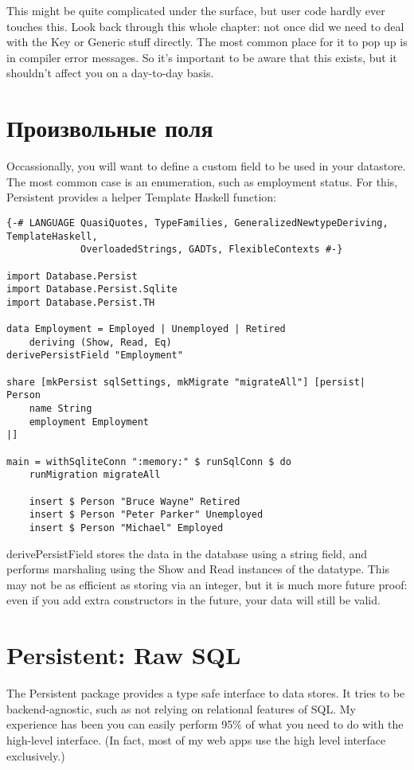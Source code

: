 This might be quite complicated under the surface, but user code hardly ever touches this. Look back through this whole chapter: not once did we need to deal with the Key or Generic stuff directly. The most common place for it to pop up is in compiler error messages. So it's important to be aware that this exists, but it shouldn't affect you on a day-to-day basis.

\section{Произвольные поля} %

Occassionally, you will want to define a custom field to be used in your datastore. The most common case is an enumeration, such as employment status. For this, Persistent provides a helper Template Haskell function:

\begin{lstlisting}
{-# LANGUAGE QuasiQuotes, TypeFamilies, GeneralizedNewtypeDeriving, TemplateHaskell,
             OverloadedStrings, GADTs, FlexibleContexts #-}

import Database.Persist
import Database.Persist.Sqlite
import Database.Persist.TH

data Employment = Employed | Unemployed | Retired
    deriving (Show, Read, Eq)
derivePersistField "Employment"

share [mkPersist sqlSettings, mkMigrate "migrateAll"] [persist|
Person
    name String
    employment Employment
|]

main = withSqliteConn ":memory:" $ runSqlConn $ do
    runMigration migrateAll

    insert $ Person "Bruce Wayne" Retired
    insert $ Person "Peter Parker" Unemployed
    insert $ Person "Michael" Employed
\end{lstlisting}%

derivePersistField stores the data in the database using a string field, and performs marshaling using the Show and Read instances of the datatype. This may not be as efficient as storing via an integer, but it is much more future proof: even if you add extra constructors in the future, your data will still be valid.

\section{Persistent: Raw SQL}

The Persistent package provides a type safe interface to data stores. It tries to be backend-agnostic, such as not relying on relational features of SQL. My experience has been you can easily perform 95\% of what you need to do with the high-level interface. (In fact, most of my web apps use the high level interface exclusively.)

